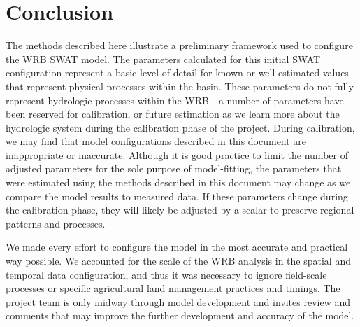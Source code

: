 \section{Conclusion}
The methods described here illustrate a preliminary framework used to configure the WRB SWAT model. The parameters calculated for this initial SWAT configuration represent a basic level of detail for known or well-estimated values that represent physical processes within the basin. These parameters do not fully represent hydrologic processes within the WRB---a number of parameters have been reserved for calibration, or future estimation as we learn more about the hydrologic system during the calibration phase of the project. During calibration, we may find that model configurations described in this document are inappropriate or inaccurate. Although it is good practice to limit the number of adjusted parameters for the sole purpose of model-fitting, the parameters that were estimated using the methods described in this document may change as we compare the model results to measured data. If these parameters change during the calibration phase, they will likely be adjusted by a scalar to preserve regional patterns and processes.

We made every effort to configure the model in the most accurate and practical way possible. We accounted for the scale of the WRB analysis in the spatial and temporal data configuration, and thus it was necessary to ignore field-scale processes or specific agricultural land management practices and timings. The project team is only midway through model development and invites review and comments that may improve the further development and accuracy of the model. 



\pagebreak